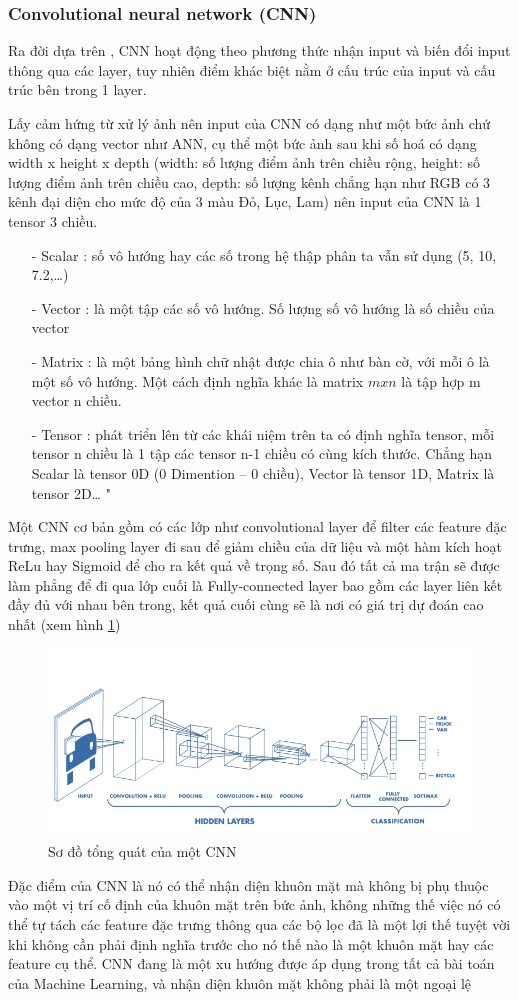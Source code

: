 \documentclass[a4paper]{report}
\begin{document}
\subsubsection{Convolutional neural network (CNN)}
Ra đời dựa trên \cite{oldcnn1, oldcnn2}, CNN hoạt động theo phương thức nhận input và biến đổi input thông qua các layer, tuy nhiên điểm khác biệt nằm ở cấu trúc của input và cấu trúc bên trong 1 layer. 
\par\noindent
Lấy cảm hứng từ xử lý ảnh nên input của CNN có dạng như một bức ảnh chứ không có dạng vector như ANN, cụ thể một bức ảnh sau khi số hoá có dạng width x height x depth (width: số lượng điểm ảnh trên chiều rộng, height: số lượng điểm ảnh trên chiều cao, depth: số lượng kênh chẳng hạn như RGB có 3 kênh đại diện cho mức độ của 3 màu Đỏ, Lục, Lam) nên input của CNN là 1 tensor 3 chiều.
\par\noindent
\begin{itemize}
\item[-] Scalar : số vô hướng hay các số trong hệ thập phân ta vẫn sử dụng (5, 10, 7.2,…)
\item[-] Vector : là một tập các số vô hướng. Số lượng số vô hướng là số chiều của vector 
\item[-] Matrix : là một bảng hình chữ nhật được chia ô như bàn cờ, với mỗi ô là một số vô hướng. Một cách định nghĩa khác là matrix $mxn$ là tập hợp m vector n chiều.
\item[-] Tensor : phát triển lên từ các khái niệm trên ta có định nghĩa tensor, mỗi tensor n chiều là 1 tập các tensor n-1 chiều có cùng kích thước. Chẳng hạn Scalar là tensor 0D (0 Dimention – 0 chiều), Vector là tensor 1D, Matrix là tensor 2D… "
\end{itemize}
\noindent
Một CNN cơ bản gồm có các lớp như convolutional layer để filter các feature đặc trưng, max pooling layer đi sau để giảm chiều của dữ liệu và một hàm kích hoạt ReLu hay Sigmoid để cho ra kết quả về trọng số. Sau đó tất cả ma trận sẽ được làm phẳng để đi qua lớp cuối là Fully-connected layer bao gồm các layer liên kết đầy đủ với nhau bên trong, kết quả cuối cùng sẽ là nơi có giá trị dự đoán cao nhất (xem hình \ref{fig:cnn})
%
\begin{figure}[H]
\centering
\includegraphics[width=.75\textwidth]{../images/fig/cnn.png}
\caption{Sơ đồ tổng quát của một CNN}
\label{fig:cnn}
\end{figure}
%
Đặc điểm của CNN là nó có thể nhận diện khuôn mặt mà không bị phụ thuộc vào một vị trí cố định của khuôn mặt trên bức ảnh, không những thế việc nó có thể tự tách các feature đặc trưng thông qua các bộ lọc đã là một lợi thế tuyệt vời khi không cần phải định nghĩa trước cho nó thế nào là một khuôn mặt hay các feature cụ thể. CNN đang là một xu hướng được áp dụng trong tất cả bài toán của Machine Learning, và nhận diện khuôn mặt không phải là một ngoại lệ
\end{document}
